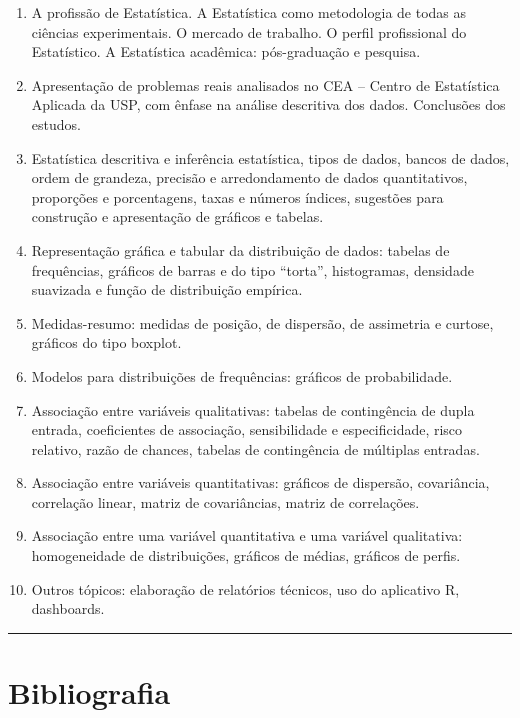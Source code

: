 \documentclass[
]{book}
\providecommand{\tightlist}{%
  \setlength{\itemsep}{0pt}\setlength{\parskip}{0pt}}
\begin{document}
\begin{enumerate}
\def\labelenumi{\arabic{enumi}.}
\tightlist
\item
  A profissão de Estatística. A Estatística como metodologia de todas as ciências experimentais. O mercado de trabalho. O perfil profissional do Estatístico. A Estatística acadêmica: pós-graduação e pesquisa.
\item
  Apresentação de problemas reais analisados no CEA -- Centro de Estatística Aplicada da USP, com ênfase na análise descritiva dos dados. Conclusões dos estudos.
\item
  Estatística descritiva e inferência estatística, tipos de dados, bancos de dados, ordem de grandeza, precisão e arredondamento de dados quantitativos, proporções e porcentagens, taxas e números índices, sugestões para construção e apresentação de gráficos e tabelas.
\item
  Representação gráfica e tabular da distribuição de dados: tabelas de frequências, gráficos de barras e do tipo ``torta'', histogramas, densidade suavizada e função de distribuição empírica.
\item
  Medidas-resumo: medidas de posição, de dispersão, de assimetria e curtose, gráficos do tipo boxplot.
\item
  Modelos para distribuições de frequências: gráficos de probabilidade.
\item
  Associação entre variáveis qualitativas: tabelas de contingência de dupla entrada, coeficientes de associação, sensibilidade e especificidade, risco relativo, razão de chances, tabelas de contingência de múltiplas entradas.
\item
  Associação entre variáveis quantitativas: gráficos de dispersão, covariância, correlação linear, matriz de covariâncias, matriz de correlações.
\item
  Associação entre uma variável quantitativa e uma variável qualitativa: homogeneidade de distribuições, gráficos de médias, gráficos de perfis.
\item
  Outros tópicos: elaboração de relatórios técnicos, uso do aplicativo R, dashboards.
\end{enumerate}

\begin{center}\rule{0.5\linewidth}{0.5pt}\end{center}

\section{Bibliografia}\label{bibliografia}
\end{document}
